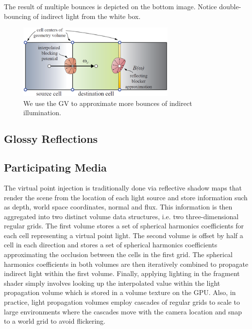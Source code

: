 The result of multiple bounces is depicted on the bottom image. Notice double-bouncing of indirect light from the white box.

\begin{figure}\label{f:lpv-multiple-indirect-bounces}
	\begin{center}
		\includegraphics[width=0.7\textwidth]{graphics/lpv/lpv-7}
	\end{center}
	\caption{We use the GV to approximate more bounces of indirect illumination.}
\end{figure}


\subsection{Glossy Reflections}
\subsection{Participating Media}


The virtual point injection is traditionally done via reflective shadow maps that render the scene from the location of each light source and store information such as depth, world space coordinates, normal and flux. This information is then aggregated into two distinct volume data structures, i.e. two three-dimensional regular grids. The first volume stores a set of spherical harmonics coefficients for each cell representing a virtual point light. The second volume is offset by half a cell in each direction and stores a set of spherical harmonics coefficients approximating the occlusion between the cells in the first grid. The spherical harmonics coefficients in both volumes are then iteratively combined to propagate indirect light within the first volume. Finally, applying lighting in the fragment shader simply involves looking up the interpolated value within the light propagation volume which is stored in a volume texture on the GPU. Also, in practice, light propagation volumes employ cascades of regular grids to scale to large environments where the cascades move with the camera location and snap to a world grid to avoid flickering.

